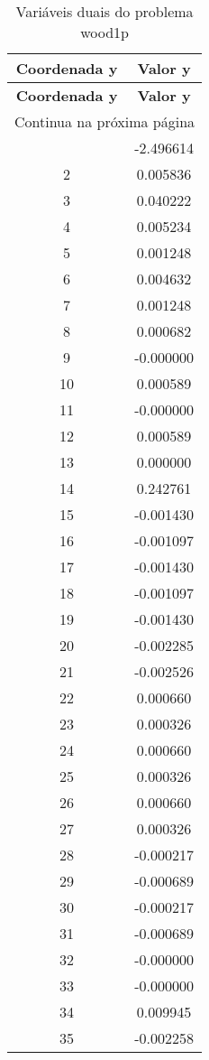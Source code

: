 \documentclass[12pt]{article}
\begin{document}
\begin{longtable}{@{}cc@{}}
\caption{Variáveis duais do problema wood1p} \\
\toprule
\textbf{Coordenada y} & \textbf{Valor y} \\
\midrule
\endfirsthead

\toprule
\textbf{Coordenada y} & \textbf{Valor y} \\
\midrule
\endhead

\midrule \multicolumn{2}{r}{{Continua na próxima página}} \\ \midrule
\endfoot

\bottomrule
\endlastfoot
1 & -2.496614 \\
2 & 0.005836 \\
3 & 0.040222 \\
4 & 0.005234 \\
5 & 0.001248 \\
6 & 0.004632 \\
7 & 0.001248 \\
8 & 0.000682 \\
9 & -0.000000 \\
10 & 0.000589 \\
11 & -0.000000 \\
12 & 0.000589 \\
13 & 0.000000 \\
14 & 0.242761 \\
15 & -0.001430 \\
16 & -0.001097 \\
17 & -0.001430 \\
18 & -0.001097 \\
19 & -0.001430 \\
20 & -0.002285 \\
21 & -0.002526 \\
22 & 0.000660 \\
23 & 0.000326 \\
24 & 0.000660 \\
25 & 0.000326 \\
26 & 0.000660 \\
27 & 0.000326 \\
28 & -0.000217 \\
29 & -0.000689 \\
30 & -0.000217 \\
31 & -0.000689 \\
32 & -0.000000 \\
33 & -0.000000 \\
34 & 0.009945 \\
35 & -0.002258 \\

\end{longtable}
\end{document}
